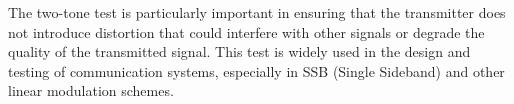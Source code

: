 The two-tone test is particularly important in ensuring that the transmitter does not introduce distortion that could interfere with other signals or degrade the quality of the transmitted signal. This test is widely used in the design and testing of communication systems, especially in SSB (Single Sideband) and other linear modulation schemes.

